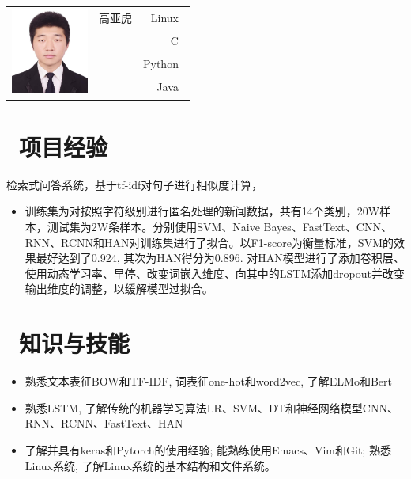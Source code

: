 \documentclass[10pt]{resume}
\begin{document}

\Large{
  \begin{tabu}{ c l r }
     & \scshape{高亚虎} & {Linux~} \\
    &  & {C~} \\
    &  & {Python~} \\
    &  & {Java~}
  \end{tabu}
}

\section{\faCogs\ 项目经验}\normalsize
{}
检索式问答系统，基于tf-idf对句子进行相似度计算，
\begin{itemize}
\item{训练集为对按照字符级别进行匿名处理的新闻数据，共有14个类别，20W样本，测试集为2W条样本。分别使用SVM、Naive Bayes、FastText、CNN、RNN、RCNN和HAN对训练集进行了拟合。以F1-score为衡量标准，SVM的效果最好达到了0.924, 其次为HAN得分为0.896. 对HAN模型进行了添加卷积层、使用动态学习率、早停、改变词嵌入维度、向其中的LSTM添加dropout并改变输出维度的调整，以缓解模型过拟合。}
\end{itemize}

\section{\faCogs\ 知识与技能}\normalsize
\begin{itemize}
  \item {熟悉文本表征BOW和TF-IDF, 词表征one-hot和word2vec, 了解ELMo和Bert}
  \item {熟悉LSTM, 了解传统的机器学习算法LR、SVM、DT和神经网络模型CNN、RNN、RCNN、FastText、HAN}
  \item {了解并具有keras和Pytorch的使用经验; 能熟练使用Emacs、Vim和Git; 熟悉Linux系统, 了解Linux系统的基本结构和文件系统。}
  \end{itemize}
\end{document}
